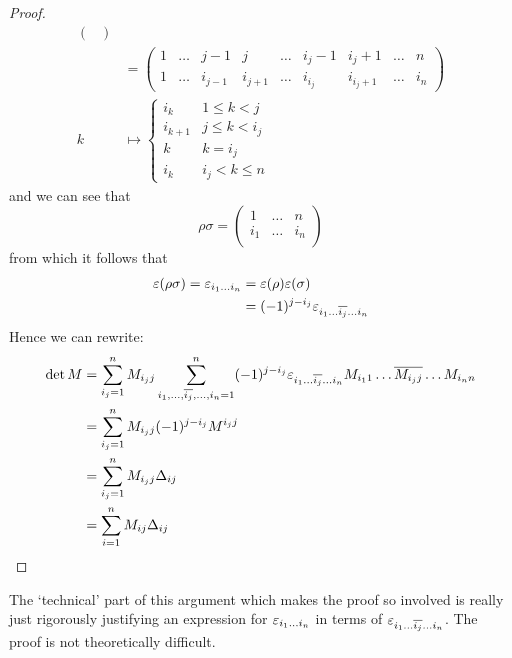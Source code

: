 \documentclass{../../template/note}
\begin{document}
\begin{proof}
\begin{align*}
\begin{pmatrix}
            \end{pmatrix} \\
            &= \begin{pmatrix}
             1 & \dots & j-1 & j & \dots & i_j - 1 & i_j + 1 & \dots & n \\
             1 & \dots & i_{j-1} & i_{j+1} & \dots & i_{i_j} & i_{i_j+1} & \dots & i_n
            \end{pmatrix} \\
            k &\mapsto \begin{cases}
                i_k & 1 \leq k < j \\
                i_{k+1} & j \leq k < i_j \\
                k & k = i_j \\
                i_k & i_j < k \leq n
            \end{cases}
        \end{align*}
        and we can see that
        \[
            \rho \sigma = \begin{pmatrix}
             1 & \dots & n \\
             i_1 & \dots & i_n \\
            \end{pmatrix}
        \]
        from which it follows that
        \begin{align*}
            \varepsilon(\rho\sigma) = \varepsilon_{i_1 \dots i_n} &= \varepsilon(\rho)\varepsilon(\sigma) \\
            &= (-1)^{j-i_j}\varepsilon_{i_1 \dots \overline{i_j} \dots i_n}
        \end{align*}
        Hence we can rewrite:
        \begin{align*}
            \det M &= \sum_{i_j=1}^n M_{i_jj} \sum_{i_1, \dots, \overline{i_j}, \dots, i_n=1}^n (-1)^{j-i_j} \varepsilon_{i_1 \dots \overline{i_j} \dots i_n} M_{i_11} \dots \overline{M_{i_jj}} \dots M_{i_nn} \\
            &= \sum_{i_j=1}^n M_{i_jj}(-1)^{j-i_j}M^{i_jj} \\
            &= \sum_{i_j=1}^n M_{i_jj} \Delta_{ij} \\
            &= \sum_{i=1}^n M_{ij} \Delta_{ij}
        \end{align*}
    \end{proof}

    \begin{remark*}
        The `technical' part of this argument which makes the proof so involved is really just rigorously justifying an expression for \(\varepsilon_{i_1 \dots i_n}\) in terms of \(\varepsilon_{i_1 \dots \overline{i_j} \dots i_n}\). The proof is not theoretically difficult.
    \end{remark*}
    
\end{document}
